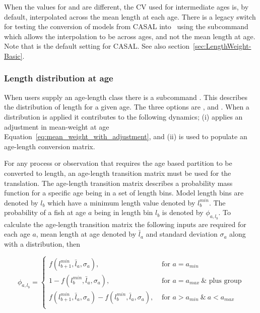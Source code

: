 When the values for  and  are different, the CV used for intermediate ages is, by default, interpolated across the mean length at each age. There is a legacy switch for testing the conversion of models from CASAL into \CNAME\ using the subcommand  which allows the interpolation to be across ages, and not the mean length at age. Note that  is the default setting for CASAL. See also section~\ref{sec:LengthWeight-Basic}.

\subsubsection{Length distribution at age}\label{sec:AgeLength-length_at_age}

When users supply an age-length class there is a subcommand . This describes the distribution of length for a given age. The three options are ,  and . When a distribution is applied it contributes to the following dynamics; (i) applies an adjustment in mean-weight at age Equation~\ref{eq:mean_weight_with_adjustment}, and (ii) is used to populate an age-length conversion matrix.

For any process or observation that requires the age based partition to be converted to length, an age-length transition matrix must be used for the translation. The age-length transition matrix describes a probability mass function for a specific age being in a set of length bins. Model length bins are denoted by \(l_b\) which have a minimum length value denoted by \(l_b^{min}\). The probability of a fish at age \(a\) being in length bin \(l_b\) is denoted by \(\phi_{a,l_b}\). To calculate the age-length transition matrix the following inputs are required for each age \(a\), mean length at age denoted by \(\bar{l}_a\) and standard deviation \(\sigma_a\) along with a distribution, then

\begin{equation}
	\phi_{a,l_b} = 
	\begin{cases}
		f(l_{b + 1}^{min},\bar{l}_a, \sigma_a), & \text{ for } a = a_{min}\\
		1 - f(l_{b}^{min},\bar{l}_a, \sigma_a), & \text{ for } a = a_{max} \ \& \text{ plus group}\\
		f(l_{b+1}^{min},\bar{l}_a, \sigma_a) - f(l_{b}^{min},\bar{l}_a, \sigma_a), & \text{ for } a > a_{min} \ \& \ a < a_{max} \\				
	\end{cases}
\end{equation}

